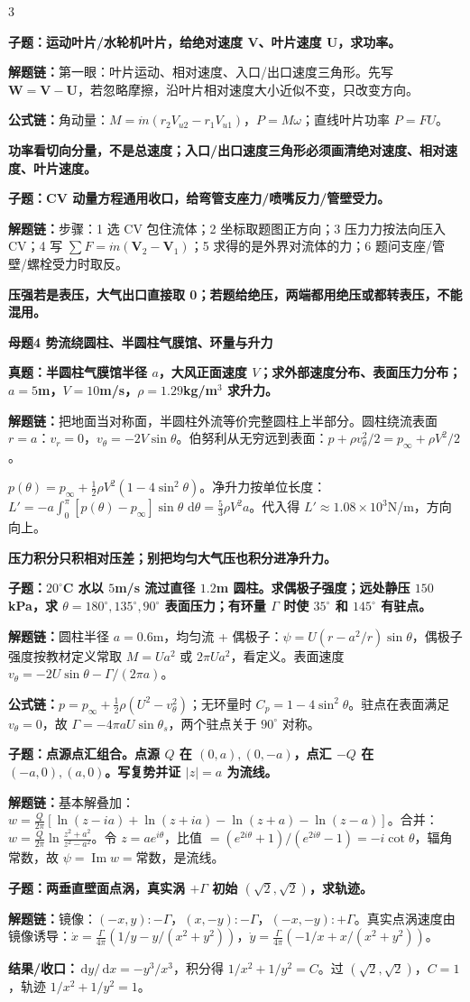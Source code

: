 \documentclass[a4paper]{article}
\newcommand{\mt}[1]{\vspace{2pt}\colorbox{M}{\parbox{\dimexpr\linewidth-2\fboxsep}{\color{white}\bfseries #1}}\par}
\newcommand{\qt}[1]{\vspace{1pt}\colorbox{Q}{\parbox{\dimexpr\linewidth-2\fboxsep}{\color{white}\bfseries #1}}\par}
\newcommand{\ans}[1]{\colorbox{G}{\parbox{\dimexpr\linewidth-2\fboxsep}{#1}}\par}
\newcommand{\warn}[1]{\colorbox{Y}{\parbox{\dimexpr\linewidth-2\fboxsep}{\color{E}\bfseries #1}}\par}
\newcommand{\chain}[1]{{\color{A}\bfseries 解题链：}#1\par}
\newcommand{\res}[1]{{\color{E}\bfseries 结果/收口：}#1\par}
\newcommand{\form}[1]{{\color{M}\bfseries 公式链：}#1\par}
\newcommand{\dd}{\,\mathrm d}
\begin{document}
\begin{multicols}{3}
\qt{子题：运动叶片/水轮机叶片，给绝对速度 $\bm V$、叶片速度 $\bm U$，求功率。}
\chain{第一眼：叶片运动、相对速度、入口/出口速度三角形。先写 $\bm W=\bm V-\bm U$，若忽略摩擦，沿叶片相对速度大小近似不变，只改变方向。}
\form{角动量：$M=\dot m(r_2V_{u2}-r_1V_{u1})$，$P=M\omega$；直线叶片功率 $P=FU$。}
\warn{功率看切向分量，不是总速度；入口/出口速度三角形必须画清绝对速度、相对速度、叶片速度。}

\qt{子题：CV 动量方程通用收口，给弯管支座力/喷嘴反力/管壁受力。}
\chain{步骤：1 选 CV 包住流体；2 坐标取题图正方向；3 压力力按法向压入 CV；4 写 $\sum F=\dot m(\bm V_2-\bm V_1)$；5 求得的是外界对流体的力；6 题问支座/管壁/螺栓受力时取反。}
\warn{压强若是表压，大气出口直接取 0；若题给绝压，两端都用绝压或都转表压，不能混用。}

\mt{母题4 势流绕圆柱、半圆柱气膜馆、环量与升力}
\qt{真题：半圆柱气膜馆半径 $a$，大风正面速度 $V$；求外部速度分布、表面压力分布；$a=5$m，$V=10$m/s，$\rho=1.29$kg/m$^3$ 求升力。}
\chain{把地面当对称面，半圆柱外流等价完整圆柱上半部分。圆柱绕流表面 $r=a$：$v_r=0$，$v_\theta=-2V\sin\theta$。伯努利从无穷远到表面：$p+\rho v_\theta^2/2=p_\infty+\rho V^2/2$。}
\ans{$p(\theta)=p_\infty+\frac12\rho V^2(1-4\sin^2\theta)$。净升力按单位长度：$L'=-a\int_0^\pi[p(\theta)-p_\infty]\sin\theta\,\dd\theta=\frac53\rho V^2a$。代入得 $L'\approx1.08\times10^3$N/m，方向向上。}
\warn{压力积分只积相对压差；别把均匀大气压也积分进净升力。}

\qt{子题：$20^\circ$C 水以 $5$m/s 流过直径 $1.2$m 圆柱。求偶极子强度；远处静压 $150$kPa，求 $\theta=180^\circ,135^\circ,90^\circ$ 表面压力；有环量 $\Gamma$ 时使 $35^\circ$ 和 $145^\circ$ 有驻点。}
\chain{圆柱半径 $a=0.6$m，均匀流 + 偶极子：$\psi=U(r-a^2/r)\sin\theta$，偶极子强度按教材定义常取 $M=Ua^2$ 或 $2\pi Ua^2$，看定义。表面速度 $v_\theta=-2U\sin\theta-\Gamma/(2\pi a)$。}
\form{$p=p_\infty+\frac12\rho(U^2-v_\theta^2)$；无环量时 $C_p=1-4\sin^2\theta$。驻点在表面满足 $v_\theta=0$，故 $\Gamma=-4\pi aU\sin\theta_s$，两个驻点关于 $90^\circ$ 对称。}

\qt{子题：点源点汇组合。点源 $Q$ 在 $(0,a),(0,-a)$，点汇 $-Q$ 在 $(-a,0),(a,0)$。写复势并证 $|z|=a$ 为流线。}
\chain{基本解叠加：$w=\frac{Q}{2\pi}[\ln(z-ia)+\ln(z+ia)-\ln(z+a)-\ln(z-a)]$。合并：$w=\frac{Q}{2\pi}\ln\frac{z^2+a^2}{z^2-a^2}$。令 $z=ae^{i\theta}$，比值 $=(e^{2i\theta}+1)/(e^{2i\theta}-1)=-i\cot\theta$，辐角常数，故 $\psi=\operatorname{Im}w=$常数，是流线。}

\qt{子题：两垂直壁面点涡，真实涡 $+\Gamma$ 初始 $(\sqrt2,\sqrt2)$，求轨迹。}
\chain{镜像：$(-x,y):-\Gamma$，$(x,-y):-\Gamma$，$(-x,-y):+\Gamma$。真实点涡速度由镜像诱导：$\dot x=\frac{\Gamma}{4\pi}(1/y-y/(x^2+y^2))$，$\dot y=\frac{\Gamma}{4\pi}(-1/x+x/(x^2+y^2))$。}
\res{$\dd y/\dd x=-y^3/x^3$，积分得 $1/x^2+1/y^2=C$。过 $(\sqrt2,\sqrt2)$，$C=1$，轨迹 $1/x^2+1/y^2=1$。}


\end{multicols}
\end{document}
